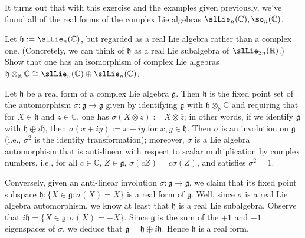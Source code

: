 \documentclass[reqno]{amsart} 
\begin{document}
It turns out that with this exercise and the examples given
previously,
we've found all of the real forms of the complex Lie algebras
$\slLie_n(\mathbb{C}), \so_n(\mathbb{C})$.

\begin{exercise}
  Let $\mathfrak{h} := \slLie_n(\mathbb{C})$,
  but regarded as a real Lie algebra rather than a complex one.
  (Concretely, we can think of $\mathfrak{h}$ as a real Lie
  subalgebra
  of $\slLie_{2 n}(\mathbb{R})$.)
  Show that one has an isomorphism of complex Lie algebras
  $\mathfrak{h} \otimes_{\mathbb{R}} \mathbb{C}
  \cong \slLie_n(\mathbb{C}) \oplus  \slLie_n(\mathbb{C})$.
\end{exercise}

\begin{remark}\label{rmk:real-forms-vs-involutions}
  Let $\mathfrak{h}$ be a real form
  of a complex Lie algebra $\mathfrak{g}$.
  Then $\mathfrak{h}$ is the fixed point set of the automorphism
  $\sigma : \mathfrak{g} \rightarrow \mathfrak{g}$
  given by
  identifying $\mathfrak{g}$ with $\mathfrak{h}
  \otimes_{\mathbb{R}} \mathbb{C}$
  and requiring that
  for $X \in \mathfrak{h}$ and $z \in \mathbb{C}$,
  one has
  $\sigma(X \otimes z) := X \otimes \overline{z}$;
  in other words,
  if we identify
  $\mathfrak{g}$ with $\mathfrak{h} \oplus i \mathfrak{h}$,
  then $\sigma(x + i y) := x - i y$ for $x,y \in \mathfrak{h}$.
  Then $\sigma$ is an involution on $\mathfrak{g}$ (i.e.,
  $\sigma^2$ is the identity transformation);
  moreover, $\sigma$ is a Lie
  algebra
  automorphism that is anti-linear with respect to scalar
  multiplication
  by complex numbers,
  i.e., for all $c \in \mathbb{C}$, $Z \in \mathfrak{g}$,
  $\sigma(c Z) = \overline{c} \sigma(Z)$,
  and satisfies $\sigma^2 = 1$.

  Conversely, given an anti-linear involution
  $\sigma : \mathfrak{g} \rightarrow \mathfrak{g}$, we claim
  that its fixed point subspace
  $\mathfrak{h} : \{X \in \mathfrak{g} : \sigma(X) = X\}$ is a
  real form of $\mathfrak{g}$.
  Well,
  since $\sigma$ is a real Lie algebra automorphism,
  we know at least that
  $\mathfrak{h}$ is a real Lie subalgebra.
  Observe that $i \mathfrak{h} = \{X \in \mathfrak{g} :
  \sigma(X) = - X\}$.
  Since $\mathfrak{g}$ is the sum of the $+1$ and $-1$
  eigenspaces
  of $\sigma$,
  we deduce that $\mathfrak{g} = \mathfrak{h} \oplus i
  \mathfrak{h}$.
  Hence $\mathfrak{h}$ is a real form.

\end{remark}
\end{document}
